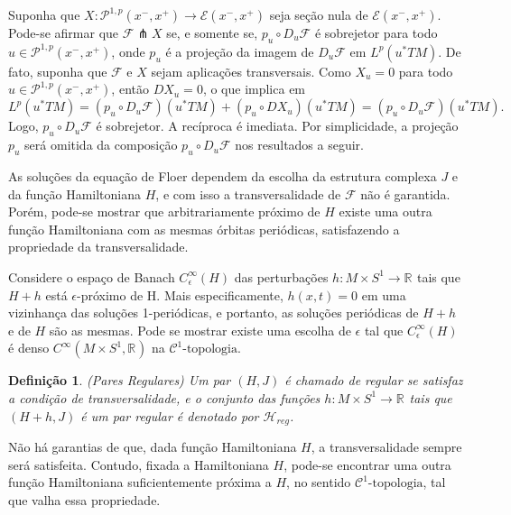 \documentclass[12pt]{book}
\newtheorem{definicao}[teorema]{Definição}
\newcommand{\aplicaoessuaves}[2]{C^{\infty}(#1, #2)}
\newcommand{\caminhosexponenciaisconectantes}[2]{\mathcal{P}^{1,p}(#1, #2)}
\newcommand{\caminhosexponenciaisconectantespadrao}{\caminhosexponenciaisconectantes{x^{-}}{x^{+}}}
\newcommand{\circulo}{S^{1}}
\newcommand{\cktopologia}[1]{\mathcal{C}^{#1}\text{-topologia}}
\newcommand{\diferencialfloerponto}[1]{D_{#1}\operadorFloer}
\newcommand{\espacoLp}[1]{L^{p}(#1)}
\newcommand{\fibradocaminhosexponenciais}{\mathcal{E}(x^{-}, x^{+})}
\newcommand{\hamiltonianasRegulares}{\mathcal{H}_{reg}}
\newcommand{\operadorFloer}{\mathcal{F}}
\newcommand{\perturbacaoHamiltoniana}[1]{C^{\infty}_{\epsilon}(#1)}
\newcommand{\pullbackfibradotangente}[2]{#1^{*}T#2}
\newcommand{\pullbackfibradotangenteM}[1]{\pullbackfibradotangente{#1}{M}}
\newcommand{\real}[1]{\mathbb{R}^{#1}}
\newcommand{\reta}{\real{}}
\begin{document}
	Suponha que $X:\caminhosexponenciaisconectantespadrao \to \fibradocaminhosexponenciais$ seja seção nula de $\fibradocaminhosexponenciais$. Pode-se afirmar que $\operadorFloer \pitchfork X$ se, e somente se, $p_{u}\circ\diferencialfloerponto{u}$ é sobrejetor para todo $u\in \caminhosexponenciaisconectantespadrao$, onde $p_{u}$ é a projeção da imagem de $\diferencialfloerponto{u}$ em $\espacoLp{\pullbackfibradotangenteM{u}}$. De fato, suponha que $\operadorFloer$ e $X$ sejam aplicações transversais. Como $X_{u} = 0$ para todo $u \in \caminhosexponenciaisconectantespadrao$, então $DX_{u} = 0$, o que implica em
	$$
	\espacoLp{\pullbackfibradotangenteM{u}} = (p_{u}\circ \diferencialfloerponto{u})(\pullbackfibradotangenteM{u}) + (p_{u}\circ DX_{u})(\pullbackfibradotangenteM{u}) = (p_{u}\circ \diferencialfloerponto{u})(\pullbackfibradotangenteM{u}).$$ 
	Logo, $p_{u}\circ\diferencialfloerponto{u}$ é sobrejetor. A recíproca é imediata. Por simplicidade, a projeção $p_{u}$ será omitida da composição $p_{u}\circ\diferencialfloerponto{u}$ nos resultados a seguir.
	
	As soluções da equação de Floer dependem da escolha da estrutura complexa $J$ e da função Hamiltoniana $H$, e com isso a transversalidade de $\operadorFloer$ não é garantida. Porém, pode-se mostrar que arbitrariamente próximo de $H$ existe uma outra função Hamiltoniana com as mesmas órbitas periódicas, satisfazendo a propriedade da transversalidade.
	
	Considere o espaço de Banach $\perturbacaoHamiltoniana{H}$ das perturbações 
	$h:M\times \circulo \to \reta$ tais que $H+h$ está $\epsilon$-próximo de H. Mais especificamente,  $h(x,t)=0$ em uma vizinhança das soluções 1-periódicas, e portanto, as soluções periódicas de $H+h$ e de $H$ são as mesmas. Pode se mostrar existe uma escolha de $\epsilon$ tal que $\perturbacaoHamiltoniana{H}$ é denso $\aplicaoessuaves{M\times \circulo}{\reta}$ na $\cktopologia{1}$.
	
	\begin{definicao}
		
		(Pares Regulares) Um par $(H, J)$ é chamado de regular se satisfaz a condição de transversalidade, e o conjunto das funções $h:M\times \circulo \to \reta$ tais que $(H+h,J)$ é um par regular é denotado por $\hamiltonianasRegulares$.
		
	\end{definicao}
	
	Não há garantias de que, dada função Hamiltoniana $H$, a transversalidade sempre será satisfeita. Contudo, fixada a Hamiltoniana $H$, pode-se encontrar uma outra função Hamiltoniana suficientemente próxima a $H$, no sentido $\cktopologia{1}$, tal que valha essa propriedade. 
	
\end{document}

